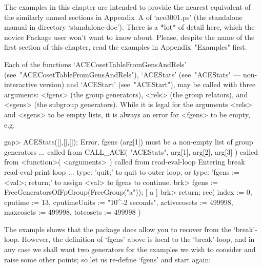 

The examples in this chapter  are  intended  to  provide  the  nearest
{\GAP} equivalent of the similarly named  sections  in  Appendix~A  of
`ace3001.ps' (the standalone manual  in  directory  `standalone-doc').
There is a *lot* of detail here, which the novice {\ACE} Package  user
won't want to know about.  Please,  despite  the  name  of  the  first
section of this chapter,  read  the  examples  in  Appendix~"Examples"
first.


Each     of     the      functions      `ACECosetTableFromGensAndRels'
(see~"ACECosetTableFromGensAndRels"), `ACEStats'  (see~"ACEStats"  ---
non-interactive  version)  and  `ACEStart'  (see~"ACEStart"),  may  be
called with three arguments: <fgens> (the  group  generators),  <rels>
(the group relators), and <sgens> (the subgroup generators). While  it
is legal for the arguments <rels> and <sgens> to be empty lists, it is
always an error for <fgens> to be empty, e.g.

\beginexample
gap> ACEStats([],[],[]);
Error, fgens (arg[1]) must be a non-empty list of group generators ...
 called from
CALL_ACE( "ACEStats", arg[1], arg[2], arg[3] ) called from
<function>( <arguments> ) called from read-eval-loop
Entering break read-eval-print loop ...
 type: 'quit;' to quit to outer loop, or
 type: 'fgens := <val>; return;' to assign <val> to fgens to continue.
brk> fgens := FreeGeneratorsOfFpGroup(FreeGroup("a"));
[ a ]
brk> return;
rec( index := 0, cputime := 13, cputimeUnits := "10^-2 seconds", 
  activecosets := 499998, maxcosets := 499998, totcosets := 499998 )
\endexample

The example shows that the {\ACE} package does allow  you  to  recover
from the `break'-loop. However, the definition  of  `fgens'  above  is
local to  the  `break'-loop,  and  in  any  case  we  shall  want  two
generators for the examples we wish to consider and raise  some  other
points; so let us re-define `fgens' and start again:

